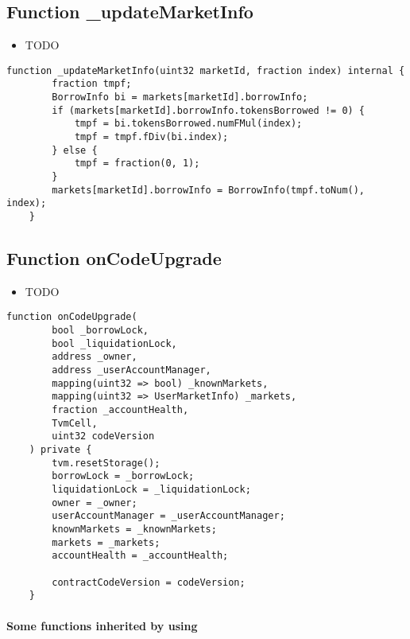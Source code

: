 \subsection{Function \_{}updateMarketInfo}

\noindent\begin{itemize}
\item TODO
\end{itemize}

\begin{lstlisting}[firstnumber=344]
    function _updateMarketInfo(uint32 marketId, fraction index) internal {
        fraction tmpf;
        BorrowInfo bi = markets[marketId].borrowInfo;
        if (markets[marketId].borrowInfo.tokensBorrowed != 0) {
            tmpf = bi.tokensBorrowed.numFMul(index);
            tmpf = tmpf.fDiv(bi.index);
        } else {
            tmpf = fraction(0, 1);
        }
        markets[marketId].borrowInfo = BorrowInfo(tmpf.toNum(), index);
    }
\end{lstlisting}

\subsection{Function onCodeUpgrade}

\noindent\begin{itemize}
\item TODO
\end{itemize}

\begin{lstlisting}[firstnumber=82]
    function onCodeUpgrade(
        bool _borrowLock,
        bool _liquidationLock,
        address _owner,
        address _userAccountManager,
        mapping(uint32 => bool) _knownMarkets,
        mapping(uint32 => UserMarketInfo) _markets,
        fraction _accountHealth,
        TvmCell,
        uint32 codeVersion
    ) private {
        tvm.resetStorage();
        borrowLock = _borrowLock;
        liquidationLock = _liquidationLock;
        owner = _owner;
        userAccountManager = _userAccountManager;
        knownMarkets = _knownMarkets;
        markets = _markets;
        accountHealth = _accountHealth;

        contractCodeVersion = codeVersion;
    }
\end{lstlisting}
\paragraph{Some functions inherited by using}
